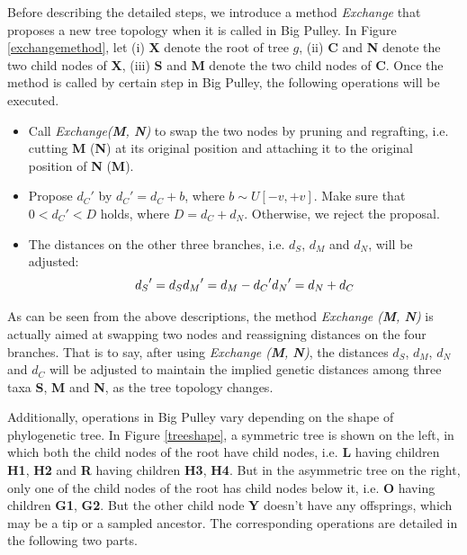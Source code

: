 \documentclass{bmcart}
\begin{document}
Before describing the detailed steps, we introduce a method \textit{Exchange} that proposes a new tree topology when it is called in Big Pulley. In Figure \ref{exchangemethod}, let (i) \textbf{X} denote the root of tree $g$, (ii) \textbf{C} and \textbf{N} denote the two child nodes of \textbf{X}, (iii) \textbf{S} and \textbf{M} denote the two child nodes of \textbf{C}. Once the method is called by certain step in Big Pulley, the following operations will be executed.
\begin{itemize}
\item Call \textit{Exchange(\textbf{M}, \textbf{N})} to swap the two nodes by pruning and regrafting, i.e. cutting \textbf{M} (\textbf{N}) at its original position and attaching it to the original position of \textbf{N} (\textbf{M}).
\item Propose ${d_C}'$ by ${d_C}' = {d_C} + b$, where $b \sim U[ - v, + v]$. Make sure that $0 < {d_C}' < D$ holds, where $D = {d_C} + {d_{N}}$. Otherwise, we reject the proposal.
\item The distances on the other three branches, i.e. $d_S$, $d_{M}$ and $d_{N}$, will be adjusted:
\begin{equation}\label{big_dis}
{d_S}' = {d_S}\\
{d_{M}}' = {d_{M}} - {d_C}'\\
{d_{N}}' = {d_{N}} + {d_C}
\end{equation}
\end{itemize}

As can be seen from the above descriptions, the method \textit{Exchange (\textbf{M}, \textbf{N})} is actually aimed at swapping two nodes and reassigning distances on the four branches. That is to say, after using \textit{Exchange (\textbf{M}, \textbf{N})}, the distances $d_S$, $d_{M}$, $d_{N}$ and $d_{C}$ will be adjusted to maintain the implied genetic distances among three taxa \textbf{S}, \textbf{M} and \textbf{N}, as the tree topology changes.

Additionally, operations in Big Pulley vary depending on the shape of phylogenetic tree. In Figure \ref{treeshape}, a symmetric tree is shown on the left, in which both the child nodes of the root have child nodes, i.e. \textbf{L} having children \textbf{H1}, \textbf{H2} and \textbf{R} having children \textbf{H3}, \textbf{H4}. But in the asymmetric tree on the right, only one of the child nodes of the root has child nodes below it, i.e. \textbf{O} having children \textbf{G1}, \textbf{G2}. But the other child node \textbf{Y} doesn't have any offsprings, which may be a tip or a sampled ancestor. The corresponding operations are detailed in the following two parts.
\end{document}
